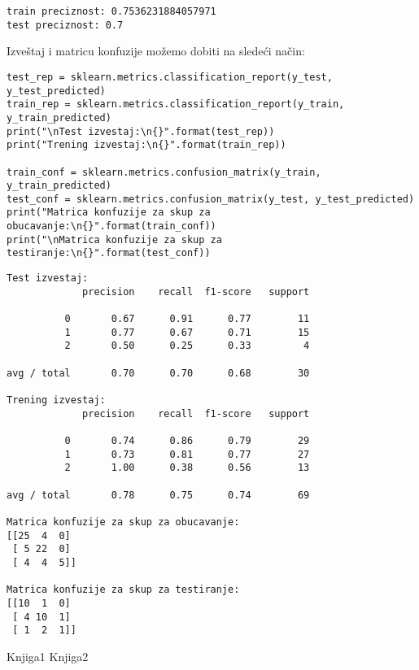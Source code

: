 \documentclass[12pt,a4paper]{article}
\begin{document}
\begin{verbatim}
train preciznost: 0.7536231884057971
test preciznost: 0.7
\end{verbatim}

Izve\v staj i matricu konfuzije mo\v zemo dobiti na slede\' ci na\v cin:

\begin{lstlisting}
test_rep = sklearn.metrics.classification_report(y_test, y_test_predicted)
train_rep = sklearn.metrics.classification_report(y_train, y_train_predicted)
print("\nTest izvestaj:\n{}".format(test_rep))
print("Trening izvestaj:\n{}".format(train_rep))

train_conf = sklearn.metrics.confusion_matrix(y_train, y_train_predicted)
test_conf = sklearn.metrics.confusion_matrix(y_test, y_test_predicted)
print("Matrica konfuzije za skup za obucavanje:\n{}".format(train_conf))
print("\nMatrica konfuzije za skup za testiranje:\n{}".format(test_conf))
\end{lstlisting}

\begin{verbatim}
Test izvestaj:
             precision    recall  f1-score   support

          0       0.67      0.91      0.77        11
          1       0.77      0.67      0.71        15
          2       0.50      0.25      0.33         4

avg / total       0.70      0.70      0.68        30

Trening izvestaj:
             precision    recall  f1-score   support

          0       0.74      0.86      0.79        29
          1       0.73      0.81      0.77        27
          2       1.00      0.38      0.56        13

avg / total       0.78      0.75      0.74        69

Matrica konfuzije za skup za obucavanje:
[[25  4  0]
 [ 5 22  0]
 [ 4  4  5]]

Matrica konfuzije za skup za testiranje:
[[10  1  0]
 [ 4 10  1]
 [ 1  2  1]]
\end{verbatim}


\begin{thebibliography}{9}
  Knjiga1
  Knjiga2
\end{thebibliography}
\end{document}
